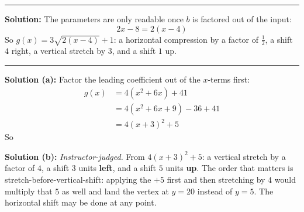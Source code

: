 \documentclass[12pt]{article}
\begin{document}
\vspace{0.1cm}\noindent\rule{\linewidth}{0.2pt}


\textbf{Solution:} The parameters are only readable once $b$ is factored out of the input:
\[ 2x - 8 = 2(x - 4) \]
So $g(x) = 3\sqrt{2(x - 4)} + 1$: a horizontal compression by a factor of $\tfrac{1}{2}$, a shift $4$ right, a vertical stretch by $3$, and a shift $1$ up. 

\vspace{0.1cm}\noindent\rule{\linewidth}{0.2pt}


\textbf{Solution (a):} Factor the leading coefficient out of the $x$-terms first:
\begin{align*}
  g(x) &= 4\left(x^{2} + 6x\right) + 41 \\
       &= 4\left(x^{2} + 6x + 9\right) - 36 + 41 \\
       &= 4(x + 3)^{2} + 5
\end{align*}
So 

\textbf{Solution (b):} \emph{Instructor-judged.} From $4(x + 3)^{2} + 5$: a vertical stretch by a factor of $4$, a shift $3$ units \textbf{left}, and a shift $5$ units \textbf{up}. The order that matters is stretch-before-vertical-shift: applying the $+5$ first and then stretching by $4$ would multiply that $5$ as well and land the vertex at $y = 20$ instead of $y = 5$. The horizontal shift may be done at any point.
\end{document}
